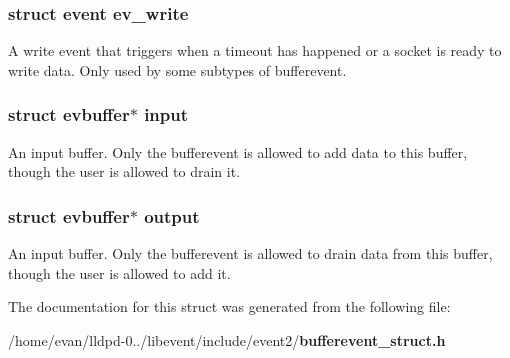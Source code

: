 \subsubsection[{ev\-\_\-write}]{\setlength{\rightskip}{0pt plus 5cm}struct {\bf event} {\bf ev\-\_\-write}}\label{structbufferevent_aff4a06b8fc928749d88997e4e724e24e}
\-A write event that triggers when a timeout has happened or a socket is ready to write data. \-Only used by some subtypes of bufferevent. 
\subsubsection[{input}]{\setlength{\rightskip}{0pt plus 5cm}struct {\bf evbuffer}$\ast$ {\bf input}}\label{structbufferevent_a4254794661c455f0e2885938d072c09c}
\-An input buffer. \-Only the bufferevent is allowed to add data to this buffer, though the user is allowed to drain it. 
\subsubsection[{output}]{\setlength{\rightskip}{0pt plus 5cm}struct {\bf evbuffer}$\ast$ {\bf output}}\label{structbufferevent_a059a4a782fcbefd9a976033f1326e813}
\-An input buffer. \-Only the bufferevent is allowed to drain data from this buffer, though the user is allowed to add it. 

\-The documentation for this struct was generated from the following file\-:\begin{DoxyCompactItemize}
\item 
/home/evan/lldpd-\/0../libevent/include/event2/{\bf bufferevent\-\_\-struct.\-h}\end{DoxyCompactItemize}
